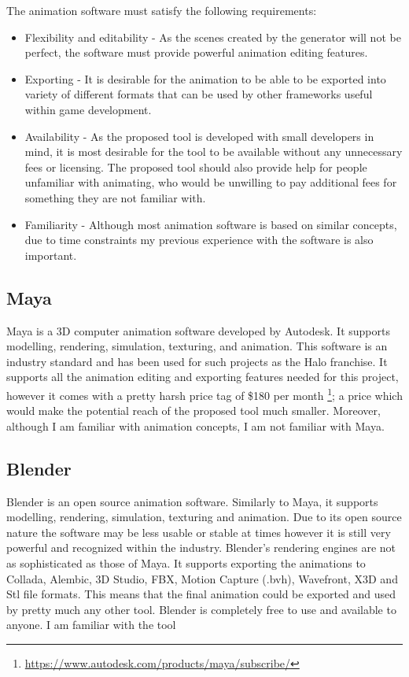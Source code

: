 The animation software must satisfy the following requirements:
\begin{itemize}
\item Flexibility and editability - As the scenes created by the generator will not be perfect, the software must provide powerful animation editing features.
\item Exporting - It is desirable for the animation to be able to be exported into variety of different formats that can be used by other frameworks useful within game development.
\item Availability - As the proposed tool is developed with small developers in mind, it is most desirable for the tool to be available without any unnecessary fees or licensing. The proposed tool should also provide help for people unfamiliar with animating, who would be unwilling to pay additional fees for something they are not familiar with.
\item Familiarity - Although most animation software is based on similar concepts, due to time constraints my previous experience with the software is also important.
\end{itemize}


\subsection{Maya}
Maya is a 3D computer animation software developed by Autodesk. It supports modelling, rendering, simulation, texturing, and animation. This software is an industry standard and has been used for such projects as the Halo franchise. It supports all the animation editing and exporting features needed for this project, however it comes with a pretty harsh price tag of \$180 per month \footnote{\url{https://www.autodesk.com/products/maya/subscribe/}}; a price which would make the potential reach of the proposed tool much smaller. Moreover, although I am familiar with animation concepts, I am not familiar with Maya.


\subsection{Blender}
Blender is an open source animation software. Similarly to Maya, it supports modelling, rendering, simulation, texturing and animation. Due to its open source nature the software may be less usable or stable at times however it is still very powerful and recognized within the industry. Blender's rendering engines are not as sophisticated as those of Maya. It supports exporting the animations to Collada, Alembic, 3D Studio, FBX, Motion Capture (.bvh), Wavefront, X3D and Stl file formats. This means that the final animation could be exported and used by pretty much any other tool. Blender is completely free to use and available to anyone. I am familiar with the tool


